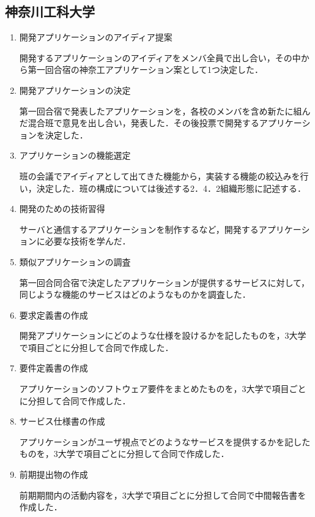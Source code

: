 \subsection{神奈川工科大学}
\begin{enumerate}
\par ●前期
\item 開発アプリケーションのアイディア提案
\par 開発するアプリケーションのアイディアをメンバ全員で出し合い，その中から第一回合宿の神奈工アプリケーション案として1つ決定した．
\item 開発アプリケーションの決定
\par 第一回合宿で発表したアプリケーションを，各校のメンバを含め新たに組んだ混合班で意見を出し合い，発表した．その後投票で開発するアプリケーションを決定した．
\item アプリケーションの機能選定
\par 班の会議でアイディアとして出てきた機能から，実装する機能の絞込みを行い，決定した．班の構成については後述する2．4．2組織形態に記述する．
\item 開発のための技術習得
\par サーバと通信するアプリケーションを制作するなど，開発するアプリケーションに必要な技術を学んだ．
\item 類似アプリケーションの調査
\par 第一回合同合宿で決定したアプリケーションが提供するサービスに対して，同じような機能のサービスはどのようなものかを調査した．
\item 要求定義書の作成
\par 開発アプリケーションにどのような仕様を設けるかを記したものを，3大学で項目ごとに分担して合同で作成した．
\item 要件定義書の作成
\par アプリケーションのソフトウェア要件をまとめたものを，3大学で項目ごとに分担して合同で作成した．
\item サービス仕様書の作成
\par アプリケーションがユーザ視点でどのようなサービスを提供するかを記したものを，3大学で項目ごとに分担して合同で作成した．
\item 前期提出物の作成
\par 前期期間内の活動内容を，3大学で項目ごとに分担して合同で中間報告書を作成した．
\end{enumerate}

